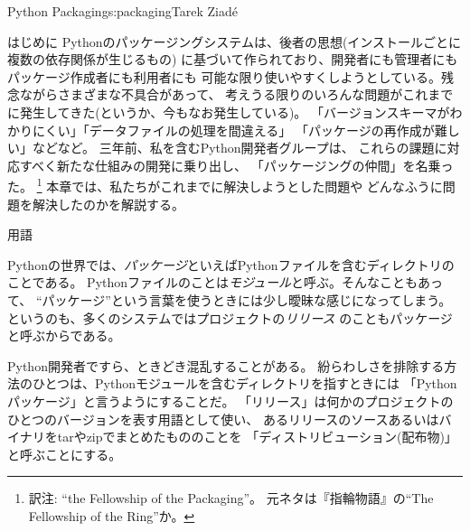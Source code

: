 \begin{aosachapter}{Python Packaging}{s:packaging}{Tarek Ziad\'{e}}
\begin{aosasect1}{はじめに}
Pythonのパッケージングシステムは、後者の思想(インストールごとに複数の依存関係が生じるもの)
に基づいて作られており、開発者にも管理者にもパッケージ作成者にも利用者にも
可能な限り使いやすくしようとしている。残念ながらさまざまな不具合があって、
考えうる限りのいろんな問題がこれまでに発生してきた(というか、今もなお発生している)。
「バージョンスキーマがわかりにくい」「データファイルの処理を間違える」
「パッケージの再作成が難しい」などなど。
三年前、私を含むPython開発者グループは、
これらの課題に対応すべく新たな仕組みの開発に乗り出し、
「パッケージングの仲間」を名乗った。
\footnote{訳注: ``the Fellowship of the Packaging''。
元ネタは『指輪物語』の``The Fellowship of the Ring''か。}
本章では、私たちがこれまでに解決しようとした問題や
どんなふうに問題を解決したのかを解説する。

\begin{aosabox}{用語}

Pythonの世界では、\emph{パッケージ}といえばPythonファイルを含むディレクトリのことである。
Pythonファイルのことは\emph{モジュール}と呼ぶ。そんなこともあって、
``パッケージ''という言葉を使うときには少し曖昧な感じになってしまう。
というのも、多くのシステムではプロジェクトの\emph{リリース}
のこともパッケージと呼ぶからである。

Python開発者ですら、ときどき混乱することがある。
紛らわしさを排除する方法のひとつは、Pythonモジュールを含むディレクトリを指すときには
「Pythonパッケージ」と言うようにすることだ。
「リリース」は何かのプロジェクトのひとつのバージョンを表す用語として使い、
あるリリースのソースあるいはバイナリをtarやzipでまとめたもののことを
「ディストリビューション(配布物)」と呼ぶことにする。


\end{aosabox}
\end{aosasect1}
\end{aosachapter}
